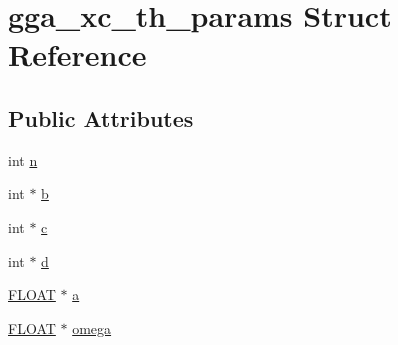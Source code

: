 \hypertarget{structgga__xc__th__params}{\section{gga\-\_\-xc\-\_\-th\-\_\-params Struct Reference}
\label{structgga__xc__th__params}
}
\subsection*{Public Attributes}
\begin{DoxyCompactItemize}
\item 
int \hyperlink{structgga__xc__th__params_aec0dfdff952f4593c8976b21c3a8c75d}{n}
\item 
int $\ast$ \hyperlink{structgga__xc__th__params_a12f43f2179bd8ff9dd80eddd295237cd}{b}
\item 
int $\ast$ \hyperlink{structgga__xc__th__params_a8c97b807c9aa8ff1685bee0fb9c313f7}{c}
\item 
int $\ast$ \hyperlink{structgga__xc__th__params_ab6243532620dedbdf9dd1feaf9dd03e7}{d}
\item 
\hyperlink{src_2xc__config_8h_ae8690abbffa85934d64d545920e2b108}{F\-L\-O\-A\-T} $\ast$ \hyperlink{structgga__xc__th__params_a6bb933b49bf8088cced4935f5629fe7b}{a}
\item 
\hyperlink{src_2xc__config_8h_ae8690abbffa85934d64d545920e2b108}{F\-L\-O\-A\-T} $\ast$ \hyperlink{structgga__xc__th__params_a097868e6695d3df1019e5239989acf98}{omega}
\end{DoxyCompactItemize}


